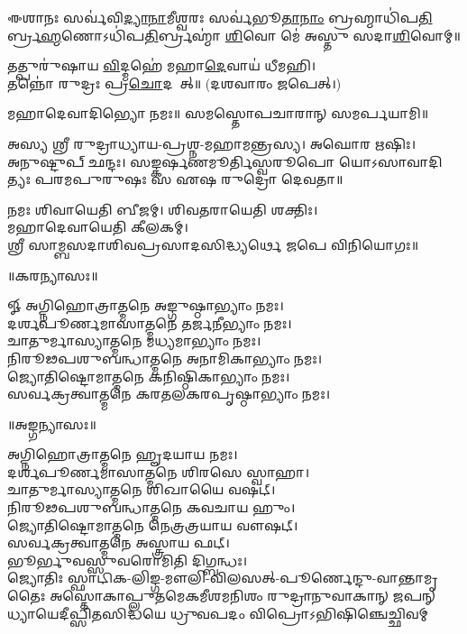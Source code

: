 𑌈𑌶𑌾𑌨𑌃 𑌸𑌰𑍍𑌵॑𑌵𑌿\ul{𑌦𑍍𑌯𑌾}\ul{𑌨𑌾}𑌮𑍀𑌶𑍍𑌵𑌰𑌃 𑌸𑌰𑍍𑌵॑𑌭𑍂\ul{𑌤𑌾}\ul{𑌨𑌾𑌂} 𑌬𑍍𑌰𑌹𑍍𑌮𑌾𑌧𑌿॑𑌪\ul{𑌤𑌿}𑌰𑍍𑌬𑍍𑌰\ul{𑌹𑍍𑌮}𑌣𑍋\-𑌽𑌧𑌿॑𑌪\ul{𑌤𑌿}𑌰𑍍𑌬𑍍𑌰𑌹𑍍𑌮𑌾॑ \ul{𑌶𑌿}𑌵𑍋 𑌮𑍇॑ 𑌅𑌸𑍍𑌤𑍁 𑌸𑌦𑌾\ul{𑌶𑌿}𑌵𑍋𑌮𑍍॥

𑌤𑌤𑍍𑌪𑍁𑌰𑍁॑𑌷𑌾𑌯 \ul{𑌵𑌿}𑌦𑍍𑌮𑌹𑍇॑ 𑌮𑌹𑌾\ul{𑌦𑍇}𑌵𑌾𑌯॑ 𑌧𑍀𑌮𑌹𑌿।\\
𑌤𑌨𑍍𑌨𑍋॑ 𑌰𑍁𑌦𑍍𑌰𑌃 𑌪𑍍𑌰\ul{𑌚𑍋}𑌦𑌯𑌾᳚𑌤𑍍॥ (𑌦𑌶𑌵𑌾𑌰𑌂 𑌜𑌪𑍇𑌤𑍍।)

𑌮𑌹𑌾𑌦𑍇𑌵𑌾𑌦𑌿𑌭𑍍𑌯𑍋 𑌨𑌮𑌃॥ 𑌸𑌮𑌸𑍍𑌤𑍋𑌪𑌚𑌾𑌰𑌾𑌨𑍍 𑌸𑌮𑌰𑍍𑌪𑌯𑌾𑌮𑌿॥

{\small \closesection}


{\small \closesection}


𑌅𑌸𑍍𑌯 𑌶𑍍𑌰𑍀 𑌰𑍁𑌦𑍍𑌰𑌾𑌧𑍍𑌯𑌾𑌯-𑌪𑍍𑌰𑌶𑍍𑌨-𑌮𑌹𑌾𑌮𑌨𑍍𑌤𑍍𑌰𑌸𑍍𑌯। 𑌅𑌘𑍋𑌰 𑌋𑌷𑌿𑌃।\\
𑌅𑌨𑍁𑌷𑍍𑌟𑍁𑌪𑍍 𑌛𑌨𑍍𑌦𑌃। 𑌸𑌙𑍍𑌕𑌰𑍍𑌷𑌣𑌮𑍂𑌰𑍍𑌤𑌿𑌸𑍍𑌵𑌰𑍂𑌪𑍋 𑌯𑍋𑌽𑌸𑌾𑌵𑌾𑌦𑌿𑌤𑍍𑌯𑌃 𑌪𑌰𑌮𑌪𑍁𑌰𑍁𑌷𑌃 𑌸 𑌏𑌷 𑌰𑍁𑌦𑍍𑌰𑍋 𑌦𑍇𑌵𑌤𑌾॥

𑌨𑌮𑌃 𑌶𑌿𑌵𑌾𑌯𑍇𑌤𑌿 𑌬𑍀𑌜𑌮𑍍। 𑌶𑌿𑌵𑌤𑌰𑌾𑌯𑍇𑌤𑌿 𑌶𑌕𑍍𑌤𑌿𑌃।\\
𑌮𑌹𑌾𑌦𑍇𑌵𑌾𑌯𑍇𑌤𑌿 𑌕𑍀𑌲𑌕𑌮𑍍।\\
𑌶𑍍𑌰𑍀 𑌸𑌾𑌮𑍍𑌬𑌸𑌦𑌾𑌶𑌿𑌵𑌪𑍍𑌰𑌸𑌾𑌦𑌸𑌿𑌦𑍍𑌧𑍍𑌯𑌰𑍍𑌥𑍇 𑌜𑌪𑍇 𑌵𑌿𑌨𑌿𑌯𑍋𑌗𑌃॥\\


\centerline{॥𑌕𑌰𑌨𑍍𑌯𑌾𑌸𑌃॥}
𑍐 𑌅𑌗𑍍𑌨𑌿𑌹𑍋𑌤𑍍𑌰𑌾𑌤𑍍𑌮𑌨𑍇 𑌅𑌙𑍍𑌗𑍁𑌷𑍍𑌠𑌾𑌭𑍍𑌯𑌾𑌂 𑌨𑌮𑌃।\\
𑌦𑌰𑍍𑌶𑌪𑍂𑌰𑍍𑌣𑌮𑌾𑌸𑌾𑌤𑍍𑌮𑌨𑍇 𑌤𑌰𑍍𑌜𑌨𑍀𑌭𑍍𑌯𑌾𑌂 𑌨𑌮𑌃।\\
𑌚𑌾𑌤𑍁𑌰𑍍𑌮𑌾𑌸𑍍𑌯𑌾𑌤𑍍𑌮𑌨𑍇 𑌮𑌧𑍍𑌯𑌮𑌾𑌭𑍍𑌯𑌾𑌂 𑌨𑌮𑌃।\\
𑌨𑌿𑌰𑍂𑌢𑌪𑌶𑍁𑌬𑌨𑍍𑌧𑌾𑌤𑍍𑌮𑌨𑍇 𑌅𑌨𑌾𑌮𑌿𑌕𑌾𑌭𑍍𑌯𑌾𑌂 𑌨𑌮𑌃।\\
𑌜𑍍𑌯𑍋𑌤𑌿𑌷𑍍𑌟𑍋𑌮𑌾𑌤𑍍𑌮𑌨𑍇 𑌕𑌨𑌿𑌷𑍍𑌠𑌿𑌕𑌾𑌭𑍍𑌯𑌾𑌂 𑌨𑌮𑌃।\\
𑌸𑌰𑍍𑌵𑌕𑍍𑌰𑌤𑍍𑌵𑌾𑌤𑍍𑌮𑌨𑍇 𑌕𑌰𑌤𑌲𑌕𑌰𑌪𑍃𑌷𑍍𑌠𑌾𑌭𑍍𑌯𑌾𑌂  𑌨𑌮𑌃।\\


\centerline{॥𑌅𑌙𑍍𑌗𑌨𑍍𑌯𑌾𑌸𑌃॥}
𑌅𑌗𑍍𑌨𑌿𑌹𑍋𑌤𑍍𑌰𑌾𑌤𑍍𑌮𑌨𑍇 𑌹𑍄𑌦𑌯𑌾𑌯 𑌨𑌮𑌃।\\
𑌦𑌰𑍍𑌶𑌪𑍂𑌰𑍍𑌣𑌮𑌾𑌸𑌾𑌤𑍍𑌮𑌨𑍇 𑌶𑌿𑌰𑌸𑍇 𑌸𑍍𑌵𑌾𑌹𑌾।\\
𑌚𑌾𑌤𑍁𑌰𑍍𑌮𑌾𑌸𑍍𑌯𑌾𑌤𑍍𑌮𑌨𑍇 𑌶𑌿𑌖𑌾𑌯𑍈 𑌵𑌷𑌟𑍍।\\
𑌨𑌿𑌰𑍂𑌢𑌪𑌶𑍁𑌬𑌨𑍍𑌧𑌾𑌤𑍍𑌮𑌨𑍇 𑌕𑌵𑌚𑌾𑌯 𑌹𑍁𑌂।\\
𑌜𑍍𑌯𑍋𑌤𑌿𑌷𑍍𑌟𑍋𑌮𑌾𑌤𑍍𑌮𑌨𑍇 𑌨𑍇𑌤𑍍𑌰𑌤𑍍𑌰𑌯𑌾𑌯 𑌵𑍗𑌷𑌟𑍍।\\
𑌸𑌰𑍍𑌵𑌕𑍍𑌰𑌤𑍍𑌵𑌾𑌤𑍍𑌮𑌨𑍇 𑌅𑌸𑍍𑌤𑍍𑌰𑌾𑌯 𑌫𑌟𑍍।\\
𑌭𑍂𑌰𑍍𑌭𑍁𑌵𑌸𑍍𑌸𑍁𑌵𑌰𑍋𑌮𑌿𑌤𑌿 𑌦𑌿𑌗𑍍𑌬𑌨𑍍𑌧𑌃।\\

\setlength{\shlokaspaceskip}{2pt}
{𑌜𑍍𑌯𑍋𑌤𑌿𑌃 𑌸𑍍𑌫𑌾𑌟𑌿𑌕-𑌲𑌿𑌙𑍍𑌗-𑌮𑍗𑌲𑌿-𑌵𑌿𑌲𑌸𑌤𑍍-𑌪𑍂𑌰𑍍𑌣𑍇𑌨𑍍𑌦𑍁-𑌵𑌾𑌨𑍍𑌤𑌾𑌮𑍃𑌤𑍈𑌃}
{𑌅𑌸𑍍𑌤𑍋𑌕𑌾𑌪𑍍𑌲𑍁𑌤𑌮𑍇𑌕𑌮𑍀𑌶𑌮𑌨𑌿𑌶𑌂 𑌰𑍁𑌦𑍍𑌰𑌾𑌨𑍁𑌵𑌾𑌕𑌾𑌨𑍍 𑌜𑌪𑌨𑍍}
{𑌧𑍍𑌯𑌾𑌯𑍇𑌦𑍀𑌪𑍍𑌸𑌿𑌤𑌸𑌿𑌦𑍍𑌧𑌯𑍇 𑌧𑍍𑌰𑍁𑌵𑌪𑌦𑌂 𑌵𑌿𑌪𑍍𑌰𑍋𑌽𑌭𑌿𑌷𑌿𑌞𑍍𑌚𑍇𑌚𑍍𑌛𑌿𑌵𑌮𑍍}

